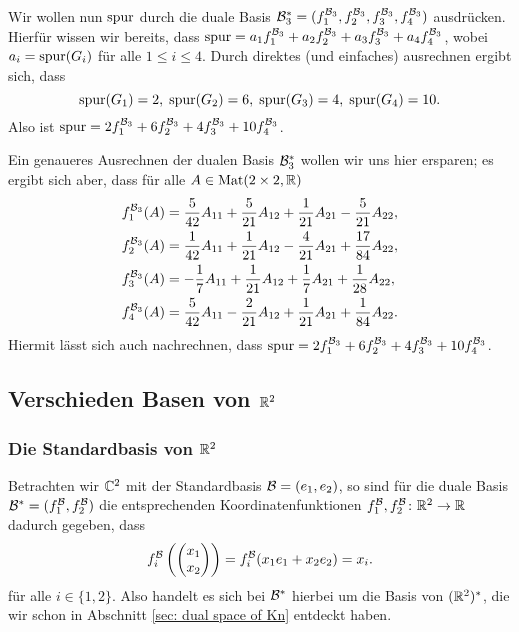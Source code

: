 \documentclass[a4paper,10pt]{article}
\begin{document}
Wir wollen nun $\mathrm{spur}$ durch die duale Basis $\mathcal{B}_3^* = (f^{\mathcal{B}_3}_1, f^{\mathcal{B}_3}_2, f^{\mathcal{B}_3}_3, f^{\mathcal{B}_3}_4)$ ausdrücken. Hierfür wissen wir bereits, dass $\mathrm{spur} = a_1 f^{\mathcal{B}_3}_1 + a_2 f^{\mathcal{B}_3}_2 + a_3 f^{\mathcal{B}_3}_3 + a_4 f^{\mathcal{B}_3}_4$, wobei $a_i = \mathrm{spur}(G_i)$ für alle $1 \leq i \leq 4$. Durch direktes (und einfaches) ausrechnen ergibt sich, dass
\[
 \mathrm{spur}(G_1) = 2, \;
 \mathrm{spur}(G_2) = 6, \;
 \mathrm{spur}(G_3) = 4, \;
 \mathrm{spur}(G_4) = 10.
\]
Also ist $\mathrm{spur} = 2 f^{\mathcal{B}_3}_1 + 6 f^{\mathcal{B}_3}_2 + 4 f^{\mathcal{B}_3}_3 + 10 f^{\mathcal{B}_3}_4$.

Ein genaueres Ausrechnen der dualen Basis $\mathcal{B}_3^*$ wollen wir uns hier ersparen; es ergibt sich aber, dass für alle $A \in \mathrm{Mat}(2 \times 2, \mathbb{R})$
\begin{align*}
 f^{\mathcal{B}_3}_1(A) &= \frac{5}{42} A_{11} + \frac{5}{21} A_{12} + \frac{1}{21} A_{21} -\frac{5}{21} A_{22}, \\
 f^{\mathcal{B}_3}_2(A) &= \frac{1}{42} A_{11} + \frac{1}{21} A_{12} - \frac{4}{21} A_{21} + \frac{17}{84} A_{22}, \\
 f^{\mathcal{B}_3}_3(A) &= -\frac{1}{7} A_{11} + \frac{1}{21} A_{12} + \frac{1}{7} A_{21} + \frac{1}{28} A_{22}, \\
 f^{\mathcal{B}_3}_4(A) &= \frac{5}{42} A_{11} - \frac{2}{21} A_{12} + \frac{1}{21} A_{21} + \frac{1}{84} A_{22}.
\end{align*}
Hiermit lässt sich auch nachrechnen, dass $\mathrm{spur} = 2 f^{\mathcal{B}_3}_1 + 6 f^{\mathcal{B}_3}_2 + 4 f^{\mathcal{B}_3}_3 + 10 f^{\mathcal{B}_3}_4$.





\subsection{Verschieden Basen von $\mathbb{R}^2$}


\subsubsection{Die Standardbasis von $\mathbb{R}^2$}
Betrachten wir $\mathbb{C}^2$ mit der Standardbasis $\mathcal{B} = (e_1, e_2)$, so sind für die duale Basis $\mathcal{B}^* = (f^{\mathcal{B}}_1, f^{\mathcal{B}}_2)$ die entsprechenden Koordinatenfunktionen $f^{\mathcal{B}}_1, f^{\mathcal{B}}_2 \colon \mathbb{R}^2 \to \mathbb{R}$ dadurch gegeben, dass
\[
 f^{\mathcal{B}}_i\left( \begin{pmatrix} x_1 \\ x_2 \end{pmatrix} \right)
 = f^{\mathcal{B}}_i(x_1 e_1 + x_2 e_2) = x_i.
\]
für alle $i \in \{1,2\}$. Also handelt es sich bei $\mathcal{B}^*$ hierbei um die Basis von $(\mathbb{R}^2)^*$, die wir schon in Abschnitt \ref{sec: dual space of Kn} entdeckt haben.
\end{document}
